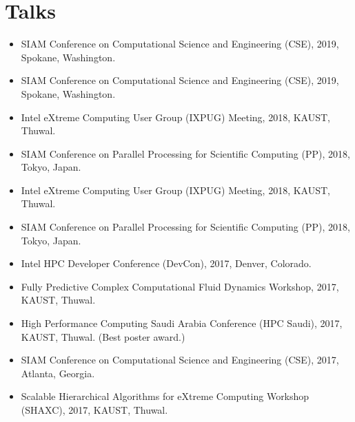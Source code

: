 \documentclass[10pt,a4paper]{moderncv}
\begin{document}
{{\section{Talks}
{
  {}{}{}{
    \begin{itemize}
    \item
    SIAM Conference on Computational Science and Engineering (CSE), 2019,
    Spokane, Washington.
    \end{itemize}
  }
  {}{}{}{
    \begin{itemize}
    \item
    SIAM Conference on Computational Science and Engineering (CSE), 2019,
    Spokane, Washington.
    \item
    Intel eXtreme Computing User Group (IXPUG) Meeting, 2018,
    KAUST, Thuwal.
    \item
    SIAM Conference on Parallel Processing for Scientific Computing (PP), 2018,
    Tokyo, Japan.
    \end{itemize}
  }
  {}{}{}{
    \begin{itemize}
      \item
      Intel eXtreme Computing User Group (IXPUG) Meeting, 2018,
      KAUST, Thuwal.
      \item
      SIAM Conference on Parallel Processing for Scientific Computing (PP), 2018,
      Tokyo, Japan.
      \item
      Intel HPC Developer Conference (DevCon), 2017,
      Denver, Colorado.
      \item
      Fully Predictive Complex Computational Fluid Dynamics Workshop, 2017,
      KAUST, Thuwal.
      \item
      High Performance Computing Saudi Arabia Conference (HPC Saudi), 2017,
      KAUST, Thuwal. (Best poster award.)
      \item
      SIAM Conference on Computational Science and Engineering (CSE), 2017,
      Atlanta, Georgia.
      \item
      Scalable Hierarchical Algorithms for eXtreme Computing Workshop (SHAXC), 2017,
      KAUST, Thuwal.
    \end{itemize}
  }
  {}{}{}{
    \begin{itemize}

\end{itemize}}}}}
\end{document}
